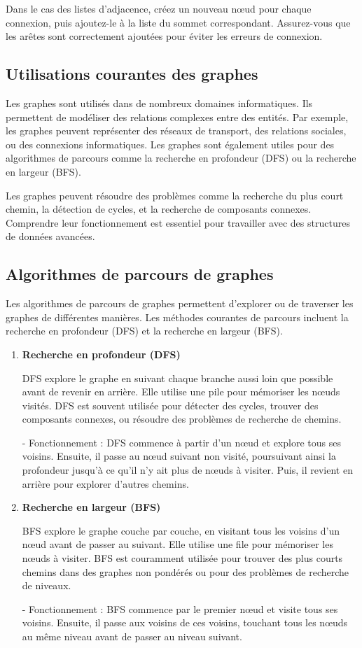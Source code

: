 Dans le cas des listes d'adjacence, créez un nouveau nœud pour chaque connexion, puis ajoutez-le à la liste du sommet correspondant. Assurez-vous que les arêtes sont correctement ajoutées pour éviter les erreurs de connexion.

\subsection{Utilisations courantes des graphes}
Les graphes sont utilisés dans de nombreux domaines informatiques. Ils permettent de modéliser des relations complexes entre des entités. Par exemple, les graphes peuvent représenter des réseaux de transport, des relations sociales, ou des connexions informatiques. Les graphes sont également utiles pour des algorithmes de parcours comme la recherche en profondeur (DFS) ou la recherche en largeur (BFS).

Les graphes peuvent résoudre des problèmes comme la recherche du plus court chemin, la détection de cycles, et la recherche de composants connexes. Comprendre leur fonctionnement est essentiel pour travailler avec des structures de données avancées.

\subsection{Algorithmes de parcours de graphes}

Les algorithmes de parcours de graphes permettent d'explorer ou de traverser les graphes de différentes manières. Les méthodes courantes de parcours incluent la recherche en profondeur (DFS) et la recherche en largeur (BFS).

\begin{enumerate}[label=\alph*)]
	\item \textbf{Recherche en profondeur (DFS)}
	
	DFS explore le graphe en suivant chaque branche aussi loin que possible avant de revenir en arrière. Elle utilise une pile pour mémoriser les nœuds visités. DFS est souvent utilisée pour détecter des cycles, trouver des composants connexes, ou résoudre des problèmes de recherche de chemins.
	
	- Fonctionnement : DFS commence à partir d'un nœud et explore tous ses voisins. Ensuite, il passe au nœud suivant non visité, poursuivant ainsi la profondeur jusqu'à ce qu'il n'y ait plus de nœuds à visiter. Puis, il revient en arrière pour explorer d'autres chemins.
	
	\item \textbf{Recherche en largeur (BFS)}
	
	BFS explore le graphe couche par couche, en visitant tous les voisins d'un nœud avant de passer au suivant. Elle utilise une file pour mémoriser les nœuds à visiter. BFS est couramment utilisée pour trouver des plus courts chemins dans des graphes non pondérés ou pour des problèmes de recherche de niveaux.
	
	- Fonctionnement : BFS commence par le premier nœud et visite tous ses voisins. Ensuite, il passe aux voisins de ces voisins, touchant tous les nœuds au même niveau avant de passer au niveau suivant.
	
\end{enumerate}

